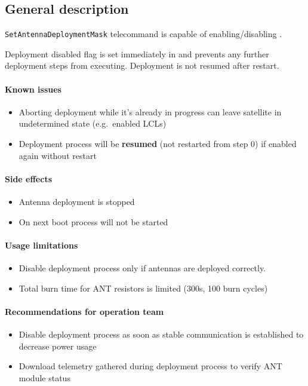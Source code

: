 

\subsection{General description}
\texttt{SetAntennaDeploymentMask} telecommand is capable of enabling/disabling .

Deployment disabled flag is set immediately in  and prevents any further deployment steps from executing. Deployment is not resumed after \OBC restart.

\paragraph{Known issues}
\begin{itemize}
	\item Aborting deployment while it's already in progress can leave satellite in undetermined state (e.g.\ enabled LCLs)
	\item Deployment process will be \textbf{resumed} (not restarted from step 0) if enabled again without \OBC restart
\end{itemize}

\paragraph{Side effects}
\begin{itemize}
	\item Antenna deployment is stopped
	\item On next \OBC boot process will not be started
\end{itemize}

\paragraph{Usage limitations} 
\begin{itemize}
	\item Disable deployment process only if antennas are deployed correctly. 
	\item Total burn time for ANT resistors is limited (300s, 100 burn cycles)
\end{itemize}

\paragraph{Recommendations for operation team} 
\begin{itemize}
	\item Disable deployment process as soon as stable communication is established to decrease power usage
	\item Download telemetry gathered during deployment process to verify ANT module status
\end{itemize}

